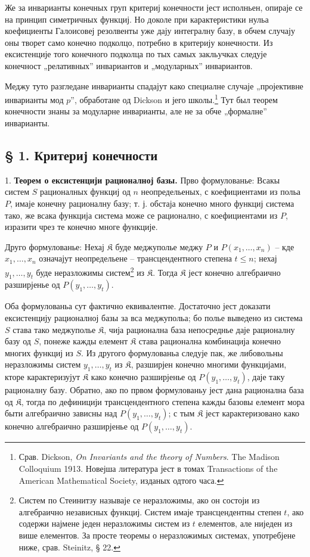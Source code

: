 ﻿\documentclass[11pt]{article}
\begin{document}
Же за инварианты конечных груп критериј конечности јест исполньен, опираје се на принцип симетричных функциј. Но доколе при карактеристики нульа коефициенты Галоисовеј резолвенты уже дају интегралну базу, в обчем случају оны творет само конечно подколцо, потребно в критерију конечности. Из ексистенције того конечного подколца по тых самых закльучках следује конечност „релативных” инвариантов и „модуларных” инвариантов.

Меджу туто разгледане инварианты спадајут како специалне случаје „пројективне инварианты мод $p$”, обработане од Dickson и јего школы.\footnote{Срав. Dickson, \emph{On Invariants and the theory of Numbers}. The Madison Colloquium 1913. Новејша литература јест в томах Transactions of the American Mathematical Society, изданых одтого часа.} Тут был теорем конечности знаны за модуларне инварианты, але не за обче „формалне” инварианты.

\subsection*{§ 1. Критериј конечности}

1. \textbf{Теорем о ексистенцији рационалној базы.} Прво формулованье: Всакы систем $S$ рационалных функциј од $n$ неопредельеных, с коефициентами из польа $P$, имаје конечну рационалну базу; т. ј. обстаја конечно много функциј система тако, же всака функција система може се рационално, с коефициентами из $P$, изразити чрез те конечно многе функције.

Друго формулованье: Нехај $\mathfrak K$ буде меджуполье меджу $P$ и $P(x_1,\ldots,x_n)$ -- кде $x_1,\ldots,x_n$ означајут неопредельене -- трансцендентного степена $t\leq n$; нехај $y_1,\ldots,y_t$ буде неразложимы систем\footnote{Систем по Стеинитзу называје се неразложимы, ако он состоји из алгебраично независных функциј. Систем имаје трансцендентны степен $t$, ако содержи најмене једен неразложимы систем из $t$ елементов, але ниједен из више елементов. За просте теоремы о неразложимых системах, употребјене ниже, срав. Steinitz, § 22.} из $\mathfrak K$. Тогда $\mathfrak K$ јест конечно алгебраично разширјенье од $P(y_1,\ldots,y_t)$.

Оба формулованьа сут фактично еквивалентне. Достаточно јест доказати ексистенцију рационалној базы за вса меджупольа; бо полье выведено из система $S$ става тако меджуполье $\mathfrak K$, чија рационална база непосреднье даје рационалну базу од $S$, понеже кажды елемент $\mathfrak K$ става рационална комбинација конечно многих функциј из $S$. Из другого формулованьа следује пак, же либовольны неразложимы систем $y_1,\ldots,y_t$ из $\mathfrak K$, разширјен конечно многими функцијами, кторе карактеризујут $\mathfrak K$ како конечно разширјенье од $P(y_1,\ldots,y_t)$, даје таку рационалну базу. Обратно, ако по првом формулованьу јест дана рационална база од $\mathfrak K$, тогда по дефиницији трансцендентного степена кажды базовы елемент мора быти алгебраично зависны над $P(y_1,\ldots,y_t)$; с тым $\mathfrak K$ јест карактеризовано како конечно алгебраично разширјенье од $P(y_1,\ldots,y_t)$.
\end{document}
